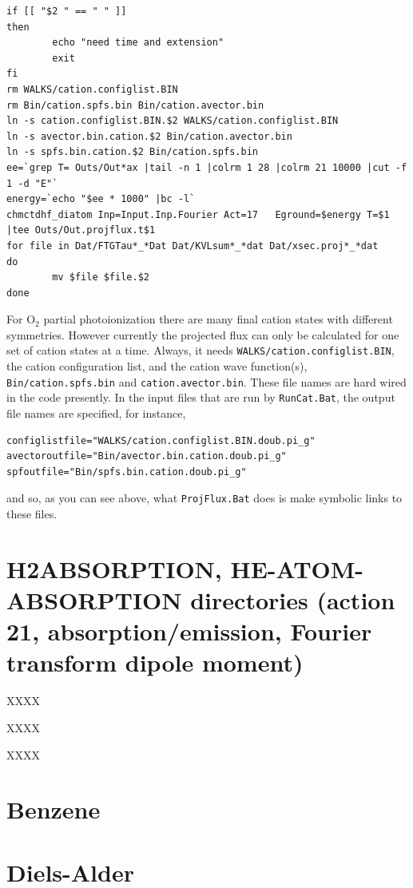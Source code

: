 \documentclass[10pt,leqno, oneside]{book}
\begin{document}
{\footnotesize
\begin{verbatim}
if [[ "$2 " == " " ]]
then
        echo "need time and extension"
        exit
fi
rm WALKS/cation.configlist.BIN
rm Bin/cation.spfs.bin Bin/cation.avector.bin
ln -s cation.configlist.BIN.$2 WALKS/cation.configlist.BIN
ln -s avector.bin.cation.$2 Bin/cation.avector.bin
ln -s spfs.bin.cation.$2 Bin/cation.spfs.bin
ee=`grep T= Outs/Out*ax |tail -n 1 |colrm 1 28 |colrm 21 10000 |cut -f 1 -d "E"`
energy=`echo "$ee * 1000" |bc -l`
chmctdhf_diatom Inp=Input.Inp.Fourier Act=17   Eground=$energy T=$1 |tee Outs/Out.projflux.t$1
for file in Dat/FTGTau*_*Dat Dat/KVLsum*_*dat Dat/xsec.proj*_*dat
do
        mv $file $file.$2
done
\end{verbatim}
}
For O$_2$ partial photoionization there are many final cation states with different symmetries.  
However currently the projected flux can only be calculated
for one set of cation states at a time.  Always, it needs \verb#WALKS/cation.configlist.BIN#, the cation 
configuration list, and the cation wave function(s), \verb#Bin/cation.spfs.bin# and \verb#cation.avector.bin#.
These file names are hard wired in the code presently.  
In the input files that are run by \verb#RunCat.Bat#, the output file names are specified, for instance,
{\footnotesize
\begin{verbatim}
configlistfile="WALKS/cation.configlist.BIN.doub.pi_g"
avectoroutfile="Bin/avector.bin.cation.doub.pi_g"
spfoutfile="Bin/spfs.bin.cation.doub.pi_g"
\end{verbatim}
}
and so, as you can see above, what \verb#ProjFlux.Bat# does is make symbolic links to these files.


\section{H2ABSORPTION, HE-ATOM-ABSORPTION directories (action 21, absorption/emission, Fourier transform dipole moment)}


XXXX

XXXX

XXXX



\section{Benzene}

\section{Diels-Alder}
\end{document}
